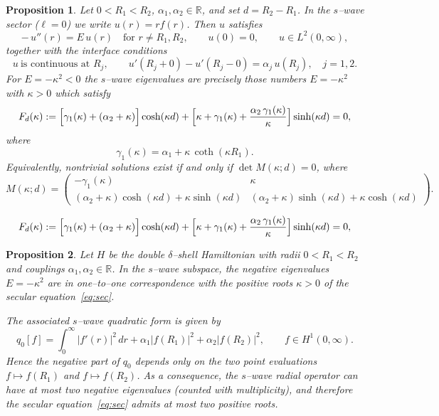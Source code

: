 \documentclass[10pt,a4paper]{amsart}
\newtheorem{prop}{Proposition}
\begin{document}
\begin{prop}\label{prop:s-wave-secular}
Let $0<R_1<R_2$, $\alpha_1,\alpha_2\in\mathbb R$, and set $d=R_2-R_1$.
In the $s$--wave sector ($\ell=0$) we write $u(r)=r f(r)$.
Then $u$ satisfies
\begin{equation}\label{1D}
-\,u''(r)=E\,u(r)\quad \text{for } r\ne R_1,R_2,\qquad
u(0)=0,\qquad u\in L^2(0,\infty),
\end{equation}
together with the interface conditions
\begin{equation}\label{u-jump}
u \ \text{is continuous at } R_j,\qquad
u'(R_j+0)-u'(R_j-0)=\alpha_j\,u(R_j),\quad j=1,2.
\end{equation}
For $E=-\kappa^2<0$ the $s$--wave eigenvalues are precisely those numbers
$E=-\kappa^2$ with $\kappa>0$ which satisfy
\begin{equation}\label{eq:sec}
F_d(\kappa):=\Bigl[\gamma_1(\kappa)+(\alpha_2+\kappa)\Bigr]\cosh(\kappa d)
+\Bigl[\kappa+\gamma_1(\kappa)+\frac{\alpha_2\,\gamma_1(\kappa)}{\kappa}\Bigr]\sinh(\kappa d)=0,
\end{equation}
where
\begin{equation}\label{gamma1}
\gamma_1(\kappa)=\alpha_1+\kappa\,\coth(\kappa R_1).
\end{equation}
Equivalently, nontrivial solutions exist if and only if $\det M(\kappa;d)=0$,
where
\begin{equation}\label{eq:matrix}
M(\kappa;d)=
\left(
\begin{array}{cc}
-\gamma_1(\kappa) & \kappa\\[4pt]
(\alpha_2+\kappa)\cosh(\kappa d)+\kappa\sinh(\kappa d) &
(\alpha_2+\kappa)\sinh(\kappa d)+\kappa\cosh(\kappa d)
\end{array}
\right).
\end{equation}
\end{prop}

\begin{equation}
F_d(\kappa):=\Bigl[\gamma_1(\kappa)+(\alpha_2+\kappa)\Bigr]\cosh(\kappa d)
+\Bigl[\kappa+\gamma_1(\kappa)+\frac{\alpha_2\,\gamma_1(\kappa)}{\kappa}\Bigr]\sinh(\kappa d)=0,
\end{equation}

\begin{prop}\label{prop:neg-crit-corrected}
Let $H$ be the double $\delta$--shell Hamiltonian with radii $0<R_1<R_2$ and
couplings $\alpha_1,\alpha_2\in\mathbb R$.
In the $s$--wave subspace, the negative eigenvalues $E=-\kappa^2$ are in
one--to--one correspondence with the positive roots $\kappa>0$ of the secular
equation~\eqref{eq:sec}.

The associated $s$--wave quadratic form is given by
\[
q_0[f]
=
\int_0^\infty |f'(r)|^2\,dr
+\alpha_1|f(R_1)|^2+\alpha_2|f(R_2)|^2,
\qquad f\in H^1(0,\infty).
\]
Hence the negative part of $q_0$ depends only on the two point evaluations
$f\mapsto f(R_1)$ and $f\mapsto f(R_2)$.
As a consequence, the $s$--wave radial operator can have at most two negative
eigenvalues (counted with multiplicity), and therefore the secular
equation~\eqref{eq:sec} admits at most two positive roots.
\end{prop}
\end{document}
